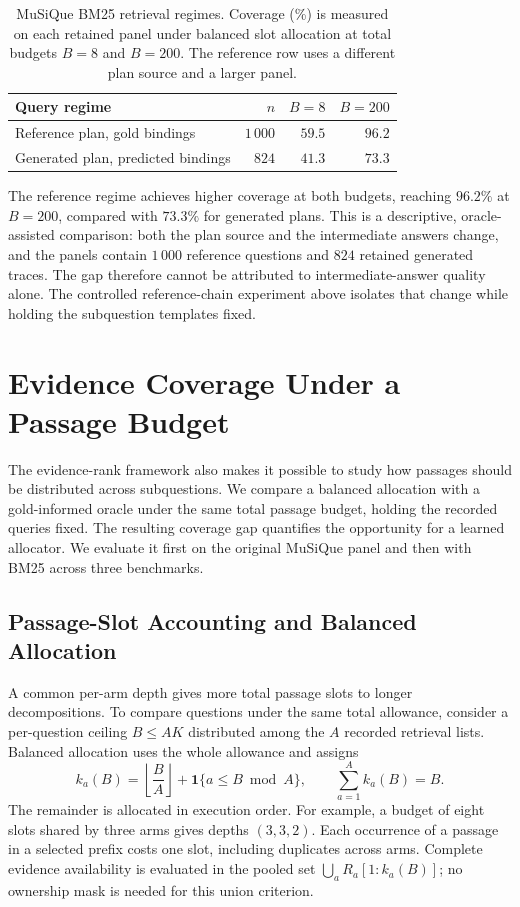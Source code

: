 \begin{table}[H]
\centering
\small
\caption{MuSiQue BM25 retrieval regimes. Coverage (\%) is measured on each
retained panel under balanced slot allocation at total budgets $B=8$ and
$B=200$. The reference row uses a different plan source and a larger panel.}
\label{tab:ch4-bm25-regimes}
\begin{tabular}{lrrr}
\hline
Query regime & $n$ & $B=8$ & $B=200$ \\
\hline
Reference plan, gold bindings & $1\,000$ & $59.5$ & $96.2$ \\
Generated plan, predicted bindings & $824$ & $41.3$ & $73.3$ \\
\hline
\end{tabular}
\end{table}

The reference regime achieves higher coverage at both budgets, reaching
$96.2\%$ at $B=200$, compared with $73.3\%$ for generated plans.
This is a descriptive, oracle-assisted comparison: both the plan source
and the intermediate answers change, and the panels contain $1\,000$
reference questions and $824$ retained generated traces. The gap therefore
cannot be attributed to intermediate-answer quality alone. The controlled
reference-chain experiment above isolates that change while holding the
subquestion templates fixed.

\section{Evidence Coverage Under a Passage Budget}
\label{sec:ch4-budget}

The evidence-rank framework also makes it possible to study how passages
should be distributed across subquestions. We compare a balanced allocation
with a gold-informed oracle under the same total passage budget, holding
the recorded queries fixed. The resulting coverage gap quantifies the
opportunity for a learned allocator. We evaluate it first on the original
MuSiQue panel and then with BM25 across three benchmarks.

\subsection{Passage-Slot Accounting and Balanced Allocation}

A common per-arm depth gives more total passage slots to longer decompositions.
To compare questions under the same total allowance, consider a per-question
ceiling $B\leq AK$ distributed among the $A$ recorded retrieval lists.
Balanced allocation uses the whole allowance and assigns
\begin{equation}
  k_a(B)=\left\lfloor\frac{B}{A}\right\rfloor
        +\mathbf{1}\{a\leq B\bmod A\},
  \qquad
  \sum_{a=1}^{A}k_a(B)=B.
  \label{eq:ch4-budget-allocation}
\end{equation}
The remainder is allocated in execution order. For example, a budget of
eight slots shared by three arms gives depths $(3,3,2)$. Each occurrence
of a passage in a selected prefix costs one slot, including duplicates across
arms. Complete evidence availability is evaluated in the pooled set
$\bigcup_a R_a[1:k_a(B)]$; no ownership mask is needed for this union criterion.

